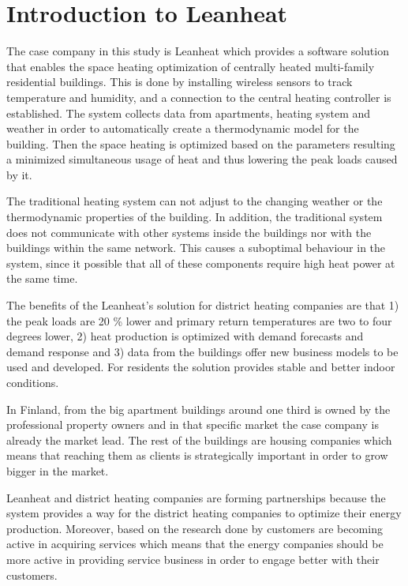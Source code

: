 \section{Introduction to Leanheat}

The case company in this study is Leanheat which provides a software solution that enables the space  heating optimization of centrally heated multi-family residential buildings. This is done by installing wireless sensors to track temperature and humidity, and a connection to the central heating controller is established. The system collects data from apartments, heating system and weather in order to automatically create a thermodynamic model for the building. Then the space heating is optimized based on the parameters resulting a minimized simultaneous usage of heat and thus lowering the peak loads caused by it. \parencite{LenheatArticle:2019}

The traditional heating system can not adjust to the changing weather or the thermodynamic properties of the building. In addition, the traditional system does not communicate with other systems inside the buildings nor with the buildings within the same network. This causes a suboptimal behaviour in the system, since it possible that all of these components require high heat power at the same time. \parencite{LenheatArticle:2019}

The benefits of the Leanheat's solution for district heating companies are that 1) the peak loads are 20 \% lower and primary return temperatures are two to four degrees lower, 2) heat production is optimized with demand forecasts and demand response and 3) data from the buildings offer new business models to be used and developed. For residents the solution provides stable and better indoor conditions. \parencite{LenheatArticle:2019}

In Finland, from the big apartment buildings around one third is owned by the professional property owners and in that specific market the case company is already the market lead. The rest of the buildings are housing companies which means that reaching them as clients is strategically important in order to grow bigger in the market.

Leanheat and district heating companies are forming partnerships because the system provides a way for the district heating companies to optimize their energy production. Moreover, based on the research done by \textcite{Energyindustry:2019} customers are becoming active in acquiring services which means that the energy companies should be more active in providing service business in order to engage better with their customers.

